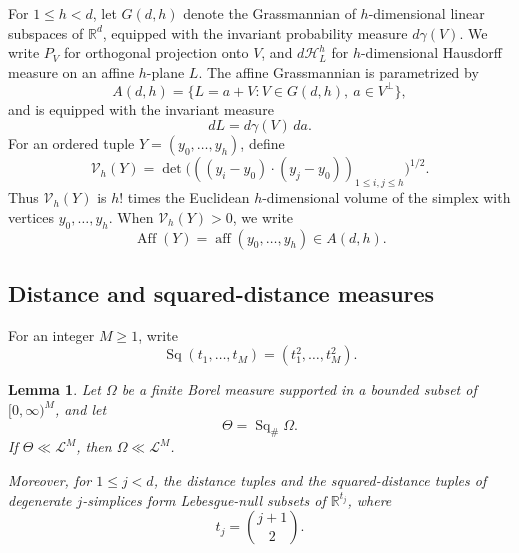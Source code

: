 \documentclass[11pt]{article}
\newtheorem{lemma}[theorem]{Lemma}
\theoremstyle{remark}
\newcommand{\R}{\mathbb R}
\newcommand{\cL}{\mathcal L}
\newcommand{\cH}{\mathcal H}
\numberwithin{equation}{section}
\newcommand{\1}{\mathbf 1}
\begin{document}
For \(1\le h<d\), let \(G(d,h)\) denote the Grassmannian of
\(h\)-dimensional linear subspaces of \(\R^d\), equipped with
the invariant probability measure \(d\gamma(V)\). We write \(P_V\) for
orthogonal projection onto \(V\), and \(d\cH_L^h\) for
\(h\)-dimensional Hausdorff measure on an affine \(h\)-plane \(L\).
The affine Grassmannian is
parametrized by
\[
 A(d,h)
 =
 \{L=a+V:V\in G(d,h),\ a\in V^\perp\},
\]
and is equipped with the invariant measure
\[
        dL=d\gamma(V)\,da.
\]
For an ordered tuple \(Y=(y_0,\ldots,y_h)\), define
\[
 \mathcal V_h(Y)
 =
 \det\!\bigl(
 ((y_i-y_0)\cdot(y_j-y_0))_{1\le i,j\le h}
 \bigr)^{1/2}.
\]
Thus \(\mathcal V_h(Y)\) is \(h!\) times the Euclidean
\(h\)-dimensional volume of the simplex with vertices
\(y_0,\ldots,y_h\). When \(\mathcal V_h(Y)>0\), we write
\[
        \operatorname{Aff}(Y)
        =
        \operatorname{aff}(y_0,\ldots,y_h)
        \in A(d,h).
\]

\subsection{Distance and squared-distance measures}

For an integer \(M\geq1\), write
\[
\operatorname{Sq}(t_1,\ldots,t_M)
=
(t_1^2,\ldots,t_M^2).
\]

\begin{lemma}
\label{lem:squaring-ac}
Let \(\Omega\) be a finite Borel measure supported in a bounded subset
of \([0,\infty)^M\), and let
\[
        \Theta=\operatorname{Sq}_\#\Omega.
\]
If \(\Theta\ll\cL^M\), then \(\Omega\ll\cL^M\).

Moreover, for \(1\leq j<d\), the distance tuples and the
squared-distance tuples of degenerate \(j\)-simplices form
Lebesgue-null subsets of \(\R^{t_j}\), where
\[
        t_j=\binom{j+1}{2}.
\]
\end{lemma}
\end{document}
